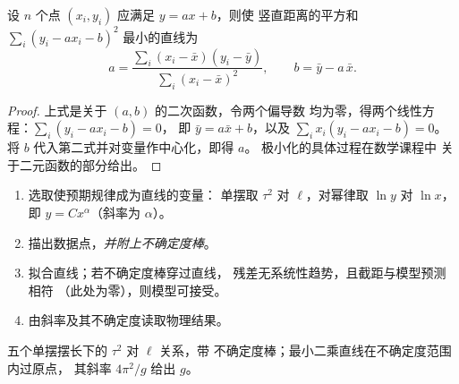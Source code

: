 \begin{proposition}[最小二乘直线]\label{prop:b1:units-dimensions:regression}
设 $n$ 个点 $(x_i, y_i)$ 应满足 $y = a x + b$，则使
竖直距离的平方和
$\sum_i (y_i - a x_i - b)^2$ 最小的直线为
\[
a = \frac{\sum_i (x_i - \bar x)(y_i - \bar y)}{\sum_i (x_i - \bar x)^2},
\qquad
b = \bar y - a\,\bar x .
\]
\end{proposition}

\begin{proof}
上式是关于 $(a, b)$ 的二次函数，令两个偏导数
均为零，得两个线性方程：$\sum_i (y_i - ax_i - b) = 0$，
即 $\bar y = a \bar x + b$，以及 $\sum_i x_i (y_i - ax_i - b) = 0$。
将 $b$ 代入第二式并对变量作中心化，即得 $a$。
极小化的具体过程在数学课程中
关于二元函数的部分给出。
\end{proof}

\begin{method}[用图像检验模型]\label{met:b1:units-dimensions:fit}
\begin{enumerate}
  \item 选取使预期规律成为直线的变量：
        单摆取 $\tau^2$ 对 $\ell$，对幂律取 $\ln y$ 对
        $\ln x$，即 $y = Cx^\alpha$（斜率为 $\alpha$）。
  \item 描出数据点，\emph{并附上不确定度棒}。
  \item 拟合直线；若不确定度棒穿过直线，
        残差无系统性趋势，且截距与模型预测相符
        （此处为零），则模型可接受。
  \item 由斜率及其不确定度读取物理结果。
\end{enumerate}
\end{method}

\begin{omfigure}

{\small 五个单摆摆长下的 $\tau^2$ 对 $\ell$ 关系，带
不确定度棒；最小二乘直线在不确定度范围内过原点，
其斜率 $4\pi^2/g$ 给出 $g$。}
\end{omfigure}

